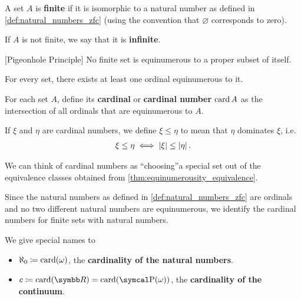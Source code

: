 \begin{definition}\label{def:finite_set}\cite[133]{Enderton1977}
  A set \( A \) is \textbf{finite} if it is isomorphic to a natural number as defined in \cref{def:natural_numbers_zfc} (using the convention that \( \varnothing \) corresponds to zero).

  If \( A \) is not finite, we say that it is \textbf{infinite}.
\end{definition}

\begin{theorem}\label{def:pigeonhole_principle}[Pigeonhole Principle]\cite[Corollary 6C]{Enderton1977}
  No finite set is equinumerous to a proper subset of itself.
\end{theorem}

\begin{theorem}\label{thm:equinumerous_ordinal_existence}\cite[197]{Enderton1977}
  For every set, there exists at least one ordinal equinumerous to it.
\end{theorem}

\begin{definition}\label{def:cardinal}\cite[197]{Enderton1977}
  For each set \( A \), define its \textbf{cardinal} or \textbf{cardinal number} \( \operatorname{card} A \) as the intersection of all ordinals that are equinumerous to \( A \).

  If \( \xi \) and \( \eta \) are cardinal numbers, we define \( \xi \leq \eta \) to mean that \( \eta \) dominates \( \xi \), i.e.
  \begin{align*}
    \xi \leq \eta \iff \left\vert \xi \right\vert \leq \left\vert \eta \right\vert.
  \end{align*}
\end{definition}

\begin{note}\label{note:cardinals}
  We can think of cardinal numbers as \enquote{choosing}\AOC a special set out of the equivalence classes obtained from \cref{thm:equinumerousity_equivalence}.

  Since the natural numbers as defined in \cref{def:natural_numbers_zfc} are ordinals and no two different natural numbers are equinumerous, we identify the cardinal numbers for finite sets with natural numbers.

  We give special names to
  \begin{itemize}
    \item \( \aleph_0 \coloneqq \operatorname{card}(\omega) \), the \textbf{cardinality of the natural numbers}.
    \item \( c \coloneqq \Card(\BB{R}) = \Card(\Power(\omega)) \), the \textbf{cardinality of the continuum}.
  \end{itemize}
\end{note}

